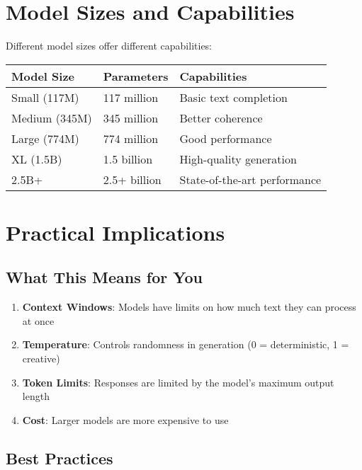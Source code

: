 \documentclass[
]{book}
\providecommand{\tightlist}{%
  \setlength{\itemsep}{0pt}\setlength{\parskip}{0pt}}
\begin{document}
\section{Model Sizes and Capabilities}\label{model-sizes-and-capabilities}

Different model sizes offer different capabilities:

\begin{longtable}[]{@{}lll@{}}
\toprule\noalign{}
Model Size & Parameters & Capabilities \\
\midrule\noalign{}
\endhead
\bottomrule\noalign{}
\endlastfoot
Small (117M) & 117 million & Basic text completion \\
Medium (345M) & 345 million & Better coherence \\
Large (774M) & 774 million & Good performance \\
XL (1.5B) & 1.5 billion & High-quality generation \\
2.5B+ & 2.5+ billion & State-of-the-art performance \\
\end{longtable}

\section{Practical Implications}\label{practical-implications}

\subsection{What This Means for You}\label{what-this-means-for-you}

\begin{enumerate}
\def\labelenumi{\arabic{enumi}.}
\tightlist
\item
  \textbf{Context Windows}: Models have limits on how much text they can process at once
\item
  \textbf{Temperature}: Controls randomness in generation (0 = deterministic, 1 = creative)
\item
  \textbf{Token Limits}: Responses are limited by the model's maximum output length
\item
  \textbf{Cost}: Larger models are more expensive to use
\end{enumerate}

\subsection{Best Practices}\label{best-practices-1}
\end{document}
